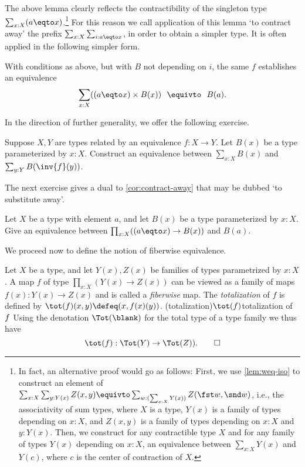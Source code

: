The above lemma clearly reflects the  contractibility of the
singleton type $\sum_{x:X}(a \eqto x)$.\footnote{%
  In fact, an alternative proof would go as follows:
  \label{ft:Sigma-assoc}
  First, we use \cref{lem:weq-iso} to construct an element of
  $\sum_{x:X}\sum_{y:Y(x)}Z(x,y)
  \equivto \sum_{w : (\sum_{x:X}Y(x))}Z(\fst w,\snd w)$, i.e.,
  the associativity of sum types, where $X$ is a type,
  $Y(x)$ is a family of types depending on $x:X$,
  and $Z(x,y)$ is a family of types depending on $x:X$ and $y:Y(x)$.
  Then, we construct for any contractible type $X$
  and for any family of types $Y(x)$ depending on $x:X$,
  an equivalence between $\sum_{x:X}Y(x)$ and $Y(c)$,
  where $c$ is the center of contraction of $X$.}
For this reason
we call application of this lemma `to contract away'
the prefix $\sum_{x:X} \sum_{i: a \eqto x}$, in order
to obtain a simpler type. It is often applied
in the following simpler form.

\begin{corollary}\label{cor:contract-away}
With conditions as above, but with $B$ not depending on $i$, the same $f$
establishes an equivalence
\[
 \sum_{x:X} ((a \eqto x)\times B(x))~~\equivto~~B(a).
\]
\end{corollary}

In the direction of further generality, we offer the following exercise.

\begin{xca}\label{xca:sum-equiv-base}
  Suppose $X,Y$ are types related by an equivalence $f : X \to Y$.
  Let $B(x)$ be a type parameterized by $x:X$. Construct an 
  equivalence between $\sum_{x:X}B(x)$ and $\sum_{y:Y}B(\inv{f}(y))$.
\end{xca}

The next exercise gives a dual to \cref{cor:contract-away}
that may be dubbed `to substitute away'.

\begin{xca}\label{xca:substitute-away}
Let $X$ be a type with element $a$, and let
$B(x)$ be a type parameterized by $x:X$.
Give an equivalence between $\prod_{x:X} ((a \eqto x)\to B(x))$ and $B(a)$.
\end{xca}

We proceed now to define the notion of fiberwise equivalence.

\begin{definition}\label{def:fiberwise}
Let $X$ be a type, and let $Y(x),Z(x)$ be families of types parametrized
by $x:X$. A map $f$ of type $\prod_{x:X}(Y(x)\to Z(x))$
can be viewed as a family of maps $f(x): Y(x)\to Z(x)$ and is called a
\emph{fiberwise} map. The \emph{totalization} of $f$ is defined by
$\tot(f)(x,y)\defeq (x,f(x)(y))$.
\glossary(totalization){$\protect\tot(f)$}{totalization of $\protect f$}
Using the denotation $\Tot(\blank)$ for the total type of
a type family we thus have
\[
  \tot(f) : \Tot(Y) \to \Tot(Z)).\qedhere
\]
\end{definition}

